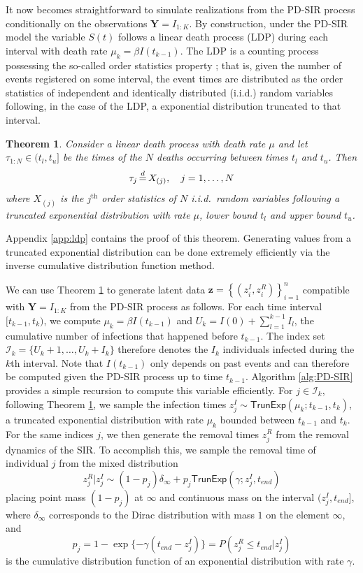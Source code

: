 \documentclass[12pt]{article}
\newtheorem{theorem}{Theorem}[section]
\begin{document}
It now becomes straightforward to simulate realizations from the PD-SIR process conditionally on the observations $\mathbf{Y} = I_{1:K}$. By construction, under the PD-SIR model the variable $S(t)$ follows a linear death process (LDP) during each interval with death rate $\mu_k = \beta I(t_{k-1})$. 
The LDP is a counting process possessing the so-called order statistics property \citep{Neuts.1971}; that is, given the number of events registered on some interval, the event times are distributed as the order statistics of independent and identically distributed (i.i.d.) random variables following, in the case of the LDP, a exponential distribution truncated to that interval.
\begin{theorem}
	\label{theo:ldp}
	Consider a linear death process with death rate $\mu$ and let $\tau_{1:N} \in (t_l, t_u]$ be the times of the $N$ deaths occurring between times $t_l$ and $t_u$. Then 
	$$\tau_j \,{\buildrel d \over =}\, X_{(j)}, \quad j = 1, \dots, N$$
	where $X_{(j)}$ is the $j^{\text{th}}$ order statistics of $N$ i.i.d.\ random variables following a truncated exponential distribution with rate $\mu$, lower bound $t_l$ and upper bound $t_u$.
\end{theorem}
Appendix \ref{app:ldp} contains the proof of this theorem. Generating values from a truncated exponential distribution can be done extremely efficiently via the inverse cumulative distribution function method.

We can use Theorem \ref{theo:ldp} to generate latent data  $\mathbf{z} = \left\lbrace (z^I_i, z^R_i)\right\rbrace_{i=1}^{n}$ compatible with $\mathbf{Y} = I_{1:K}$ from the PD-SIR process as follows. For each time interval $[t_{k-1}, t_k)$, we compute $\mu_k = \beta I(t_{k-1})$ and $U_k = I(0) + \sum_{l=1}^{k-1} I_l$, the cumulative number of infections that happened before $t_{k-1}$. The index set $\mathcal{I}_k = \{U_k + 1, \dots, U_k + I_k\}$ therefore denotes the $I_k$ individuals infected during the $k$th interval. Note that $I(t_{k-1})$ only depends on past events and can therefore be computed given the PD-SIR process up to time $t_{k-1}$. Algorithm \ref{alg:PD-SIR} provides a simple recursion to compute this variable efficiently. For $j \in \mathcal{I}_k$, following Theorem \ref{theo:ldp}, we sample the infection times $z^I_j \sim \textsf{TrunExp}(\mu_k; t_{k-1}, t_k)$, a truncated exponential distribution with rate $\mu_k$ bounded between $t_{k-1}$ and $t_k$. For the same indices $j$, we then generate the removal times $z^R_j$ from the removal dynamics of the SIR. To accomplish this, we sample the removal time of individual $j$ from the mixed distribution
$$z^R_j|z^I_j \sim (1 - p_j) \delta_{\infty} + p_j \textsf{TrunExp}(\gamma; z^I_j, t_{end})$$
placing point mass $(1 - p_j)$ at $\infty$ and continuous mass on the interval $(z^I_j, t_{end}]$,
where $\delta_{\infty}$ corresponds to the Dirac distribution with mass $1$ on the element $\infty$, and
$$p_j = 1 - \exp\{-\gamma (t_{end} - z^I_j)\} = P(z^R_j \le t_{end} | z^I_j)$$
is the cumulative distribution function of an exponential distribution with rate $\gamma$. %
\end{document}
